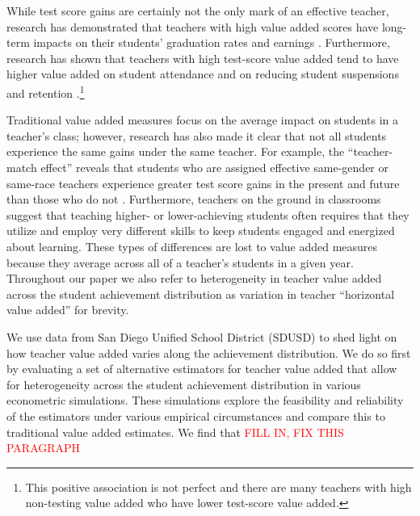 \documentclass[letterpaper,12pt]{article}
\begin{document}
While test score gains are certainly not the only mark of an effective teacher, research has demonstrated that teachers with high value added scores have long-term impacts on their students' graduation rates and earnings \citep{chetty2014measuring2}. Furthermore, research has shown that teachers with high test-score value added tend to have higher value added on student attendance and on reducing student suspensions and retention \citep{pope2017multidimensional}.\footnote{This positive association is not perfect and there are many teachers with high non-testing value added who have lower test-score value added.} 

Traditional value added measures focus on the average impact on students in a teacher's class; however, research has also made it clear that not all students experience the same gains under the same teacher. For example, the ``teacher-match effect'' reveals that students who are assigned effective same-gender or same-race teachers experience greater test score gains in the present and future than those who do not \citep{dee2005teacher,delhommer2019highschool}. Furthermore, teachers on the ground in classrooms suggest that teaching higher- or lower-achieving students often requires that they utilize and employ very different skills to keep students engaged and energized about learning. These types of differences are lost to value added measures because they average across all of a teacher's students in a given year. Throughout our paper we also refer to heterogeneity in teacher value added across the student achievement distribution as variation in teacher ``horizontal value added'' for brevity.

We use data from San Diego Unified School District (SDUSD) to shed light on how teacher value added varies along the achievement distribution. We do so first by evaluating a set of alternative estimators for teacher value added that allow for heterogeneity across the student achievement distribution in various econometric simulations. These simulations explore the feasibility and reliability of the estimators under various empirical circumstances and compare this to traditional value added estimates. We find that \textcolor{red}{FILL IN, FIX THIS PARAGRAPH}
\end{document}
